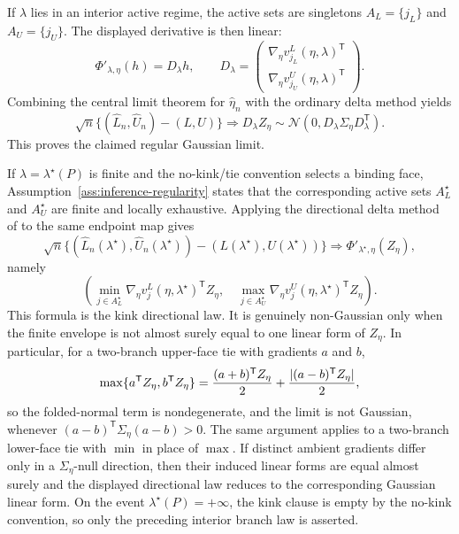 \documentclass[11pt]{article}
\newcommand{\transpose}{\mathsf{T}}
\theoremstyle{definition}
\theoremstyle{plain}
\theoremstyle{remark}
\begin{document}
If \(\lambda\) lies in an interior active regime, the active sets are singletons
\(A_L=\{j_L\}\) and \(A_U=\{j_U\}\).  The displayed derivative is then linear:
\[
  \Phi'_{\lambda,\eta}(h)
  =
  D_\lambda h,\qquad
  D_\lambda=
  \begin{pmatrix}
    \nabla_\eta v^L_{j_L}(\eta,\lambda)^\transpose\\
    \nabla_\eta v^U_{j_U}(\eta,\lambda)^\transpose
  \end{pmatrix}.
\]
Combining the central limit theorem for \(\widehat\eta_n\) with the ordinary delta
method yields
\[
  \sqrt n\{(\widehat L_n,\widehat U_n)-(L,U)\}
  \Rightarrow
  D_\lambda Z_\eta
  \sim
  \mathcal N(0,D_\lambda\Sigma_\eta D_\lambda^\transpose).
\]
This proves the claimed regular Gaussian limit.

If \(\lambda=\lambda^\star(P)\) is finite and the no-kink/tie convention selects a
binding face, Assumption~\ref{ass:inference-regularity} states that the corresponding active
sets \(A_L^\star\) and \(A_U^\star\) are finite and locally exhaustive.  Applying the
directional delta method of \citet{FangSantos2019DirectionallyDifferentiable} to the
same endpoint map gives
\[
  \sqrt n\{(\widehat L_n(\lambda^\star),\widehat U_n(\lambda^\star))
          -(L(\lambda^\star),U(\lambda^\star))\}
  \Rightarrow
  \Phi'_{\lambda^\star,\eta}(Z_\eta),
\]
namely
\[
  \left(
    \min_{j\in A_L^\star}
      \nabla_\eta v^L_j(\eta,\lambda^\star)^\transpose Z_\eta,\quad
    \max_{j\in A_U^\star}
      \nabla_\eta v^U_j(\eta,\lambda^\star)^\transpose Z_\eta
  \right).
\]
This formula is the kink directional law.  It is genuinely non-Gaussian only when the
finite envelope is not almost surely equal to one linear form of \(Z_\eta\).  In
particular, for a two-branch upper-face tie with gradients \(a\) and \(b\),
\[
  \max\{a^\transpose Z_\eta,b^\transpose Z_\eta\}
  =
  { (a+b)^\transpose Z_\eta \over 2}
  +
  { |(a-b)^\transpose Z_\eta| \over 2},
\]
so the folded-normal term is nondegenerate, and the limit is not Gaussian, whenever
\((a-b)^\transpose\Sigma_\eta(a-b)>0\).  The same argument applies to a two-branch
lower-face tie with \(\min\) in place of \(\max\).  If distinct ambient gradients
differ only in a \(\Sigma_\eta\)-null direction, then their induced linear forms are
equal almost surely and the displayed directional law reduces to the corresponding
Gaussian linear form.  On the event
\(\lambda^\star(P)=+\infty\), the kink clause is empty by the no-kink convention, so
only the preceding interior branch law is asserted.
\end{document}
